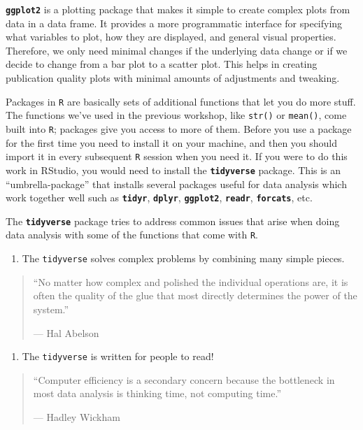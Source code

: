 \documentclass[
]{article}
\providecommand{\tightlist}{%
  \setlength{\itemsep}{0pt}\setlength{\parskip}{0pt}}
\begin{document}
\textbf{\texttt{ggplot2}} is a plotting package that makes it simple to
create complex plots from data in a data frame. It provides a more
programmatic interface for specifying what variables to plot, how they
are displayed, and general visual properties. Therefore, we only need
minimal changes if the underlying data change or if we decide to change
from a bar plot to a scatter plot. This helps in creating publication
quality plots with minimal amounts of adjustments and tweaking.

Packages in \texttt{R} are basically sets of additional functions that
let you do more stuff. The functions we've used in the previous
workshop, like \texttt{str()} or \texttt{mean()}, come built into
\texttt{R}; packages give you access to more of them. Before you use a
package for the first time you need to install it on your machine, and
then you should import it in every subsequent \texttt{R} session when
you need it. If you were to do this work in RStudio, you would need to
install the \textbf{\texttt{tidyverse}} package. This is an
``umbrella-package'' that installs several packages useful for data
analysis which work together well such as \textbf{\texttt{tidyr}},
\textbf{\texttt{dplyr}}, \textbf{\texttt{ggplot2}},
\textbf{\texttt{readr}}, \textbf{\texttt{forcats}}, etc.

The \textbf{\texttt{tidyverse}} package tries to address common issues
that arise when doing data analysis with some of the functions that come
with \texttt{R}.

\begin{enumerate}
\def\labelenumi{\arabic{enumi}.}
\tightlist
\item
  The \texttt{tidyverse} solves complex problems by combining many
  simple pieces.
\end{enumerate}

\begin{quote}
``No matter how complex and polished the individual operations are, it
is often the quality of the glue that most directly determines the power
of the system.''

--- Hal Abelson
\end{quote}

\begin{enumerate}
\def\labelenumi{\arabic{enumi}.}
\setcounter{enumi}{1}
\tightlist
\item
  The \texttt{tidyverse} is written for people to read!
\end{enumerate}

\begin{quote}
``Computer efficiency is a secondary concern because the bottleneck in
most data analysis is thinking time, not computing time.''

--- Hadley Wickham
\end{quote}
\end{document}
